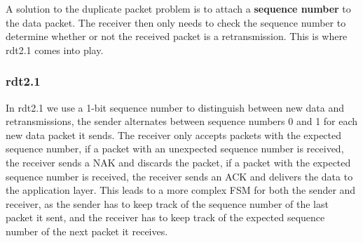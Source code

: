 \documentclass[12pt letter]{report}
\begin{document}
A solution to the duplicate packet problem is to attach a
\textbf{sequence number} to the data packet. The receiver then only
needs to check the sequence number to determine whether or not the
received packet is a retransmission. This is where rdt2.1 comes into play.

\subsubsection{rdt2.1}

In rdt2.1 we use a 1-bit sequence number to distinguish between new
data and retransmissions, the sender alternates between sequence
numbers 0 and 1 for each new data packet it sends. The receiver only
accepts packets with the expected sequence number, if a packet with
an unexpected sequence number is received, the receiver sends a NAK
and discards the packet, if a packet with the expected sequence number
is received, the receiver sends an ACK and delivers the data to the
application layer. This leads to a more complex FSM for both the
sender and receiver, as the sender has to keep track of the sequence
number of the last packet it sent, and the receiver has to keep track
of the expected sequence number of the next packet it receives.
\end{document}
